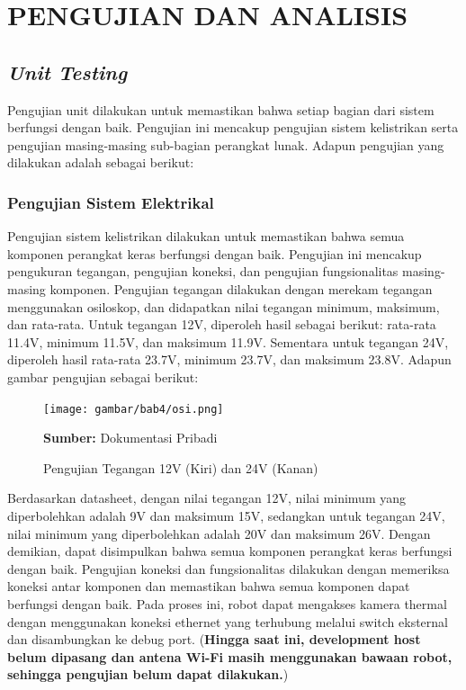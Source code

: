 \chapter{PENGUJIAN DAN ANALISIS}
\label{chap:pengujiananalisis}


\section{\emph{Unit Testing}}
Pengujian unit dilakukan untuk memastikan bahwa setiap bagian dari sistem berfungsi dengan baik. Pengujian ini mencakup pengujian sistem kelistrikan serta pengujian masing-masing sub-bagian perangkat lunak. Adapun pengujian yang dilakukan adalah sebagai berikut:

\subsection{Pengujian Sistem Elektrikal}
\sloppy
Pengujian sistem kelistrikan dilakukan untuk memastikan bahwa semua komponen perangkat keras berfungsi dengan baik. Pengujian ini mencakup pengukuran tegangan, pengujian koneksi, dan pengujian fungsionalitas masing-masing komponen. Pengujian tegangan dilakukan dengan merekam tegangan menggunakan osiloskop, dan didapatkan nilai tegangan minimum, maksimum, dan rata-rata. Untuk tegangan 12V, diperoleh hasil sebagai berikut: rata-rata 11.4V, minimum 11.5V, dan maksimum 11.9V. Sementara untuk tegangan 24V, diperoleh hasil rata-rata 23.7V, minimum 23.7V, dan maksimum 23.8V. Adapun gambar pengujian sebagai berikut:

\begin{figure}[H] 
    \centering
    \texttt{[image: gambar/bab4/osi.png]}
    \caption{Pengujian Tegangan 12V (Kiri) dan 24V (Kanan)}
    \label{fig:pengujian_tegangan}
    \footnotesize{\textbf{Sumber:} Dokumentasi Pribadi}
\end{figure}

Berdasarkan datasheet, dengan nilai tegangan 12V, nilai minimum yang diperbolehkan adalah 9V dan maksimum 15V, sedangkan untuk tegangan 24V, nilai minimum yang diperbolehkan adalah 20V dan maksimum 26V. Dengan demikian, dapat disimpulkan bahwa semua komponen perangkat keras berfungsi dengan baik. Pengujian koneksi dan fungsionalitas dilakukan dengan memeriksa koneksi antar komponen dan memastikan bahwa semua komponen dapat berfungsi dengan baik. Pada proses ini, robot dapat mengakses kamera thermal dengan menggunakan koneksi ethernet yang terhubung melalui switch eksternal dan disambungkan ke debug port. (\textbf{Hingga saat ini, development host belum dipasang dan antena Wi-Fi masih menggunakan bawaan robot, sehingga pengujian belum dapat dilakukan.})



